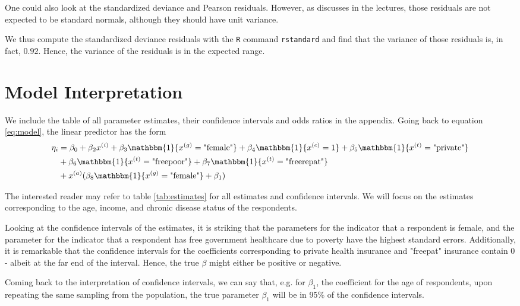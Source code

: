 \documentclass[a4paper,11pt]{article}
\begin{document}
One could also look at the standardized deviance and Pearson residuals. However, as discusses in the lectures, those residuals are not expected to be standard normals, although they should have unit variance.

We thus compute the standardized deviance residuals with the \texttt{R} command \texttt{rstandard} and find that the variance of those residuals is, in fact, $0.92$. Hence, the variance of the residuals is in the expected range.

\section{Model Interpretation}

We include the table of all parameter estimates, their confidence intervals and odds ratios in the appendix. Going back to equation \ref{eq:model}, the linear predictor has the form
\begin{align}
\eta_i &= \beta_0  +  \beta_2 x^{(i)} + \beta_3 \mathbbm{1}\{x^{(g)} = \text{"female"}\}     +\beta_4\mathbbm{1}\{x^{(c)} = 1\}   + 
 \beta_5\mathbbm{1}\{x^{(t)} = \text{"private"}\}    \\
 &+  \beta_6\mathbbm{1}\{x^{(t)} = \text{"freepoor"}\}  + \beta_7 \mathbbm{1}\{x^{(t)} = \text{"freerepat"}\}  \\
&+   x^{(a)}(\beta_8 \mathbbm{1}\{x^{(g)} = \text{"female"} \} + \beta_1)
\end{align}



The interested reader may refer to table \ref{tab:estimates} for all estimates and confidence intervals. We will focus on the estimates corresponding to the age, income, and chronic disease status of the respondents.

Looking at the confidence intervals of the estimates, it is striking that the parameters for the indicator that a respondent is female, and the parameter for the indicator that a respondent has free government healthcare due to poverty have the highest standard errors. Additionally, it is remarkable that the confidence intervals for the coefficients corresponding to private health insurance and "freepat" insurance contain $0$ - albeit at the far end of the interval. Hence, the true $\beta$ might either be positive or negative.

Coming back to the interpretation of confidence intervals, we can say that, e.g. for $\beta_1$, the coefficient for the age of respondents, upon repeating the same sampling from the population, the true parameter $\beta_1$ will be in 95\% of the confidence intervals.
\end{document}
